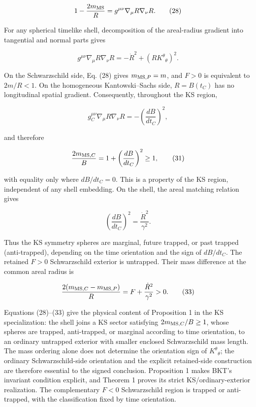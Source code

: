 \documentclass[pdflatex,sn-mathphys-num]{sn-jnl}
\begin{document}
\begin{equation}
1-\frac{2m_{\rm MS}}{R}
=g^{\mu\nu}\nabla_\mu R\nabla_\nu R.
\tag{28}
\end{equation}

For any spherical timelike shell, decomposition of the areal-radius gradient into tangential and normal parts gives


\begin{equation}
g^{\mu\nu}\nabla_\mu R\nabla_\nu R
=-\dot R^2+\left(RK^\theta{}_{\theta}\right)^2.
\tag{29}
\end{equation}

On the Schwarzschild side, Eq. (28) gives \(m_{{\rm MS},P}=m\), and \(F>0\) is equivalent to \(2m/R<1\). On the homogeneous Kantowski--Sachs side, \(R=B(t_C)\) has no longitudinal spatial gradient. Consequently, throughout the KS region,


\begin{equation}
g_C^{\mu\nu}\nabla_\mu R\nabla_\nu R
=-\left(\frac{dB}{dt_C}\right)^2,
\tag{30}
\end{equation}

and therefore


\begin{equation}
\frac{2m_{{\rm MS},C}}{B}
=1+\left(\frac{dB}{dt_C}\right)^2\ge1,
\tag{31}
\end{equation}

with equality only where \(dB/dt_C=0\). This is a property of the KS region, independent of any shell embedding. On the shell, the areal matching relation gives


\begin{equation}
\left(\frac{dB}{dt_C}\right)^2
=\frac{\dot R^2}{\gamma^2}.
\tag{32}
\end{equation}

Thus the KS symmetry spheres are marginal, future trapped, or past trapped (anti-trapped), depending on the time orientation and the sign of \(dB/dt_C\). The retained \(F>0\) Schwarzschild exterior is untrapped. Their mass difference at the common areal radius is


\begin{equation}
\frac{2(m_{{\rm MS},C}-m_{{\rm MS},P})}{R}
=F+\frac{\dot R^2}{\gamma^2}>0.
\tag{33}
\end{equation}

Equations (28)--(33) give the physical content of Proposition 1 in the KS specialization: the shell joins a KS sector satisfying \(2m_{{\rm MS},C}/B\ge1\), whose spheres are trapped, anti-trapped, or marginal according to time orientation, to an ordinary untrapped exterior with smaller enclosed Schwarzschild mass length. The mass ordering alone does not determine the orientation sign of \(K^\theta{}_{\theta}\); the ordinary Schwarzschild-side orientation and the explicit retained-side construction are therefore essential to the signed conclusion. Proposition 1 makes BKT's invariant condition explicit, and Theorem 1 proves its strict KS/ordinary-exterior realization. The complementary \(F<0\) Schwarzschild region is trapped or anti-trapped, with the classification fixed by time orientation.
\end{document}
